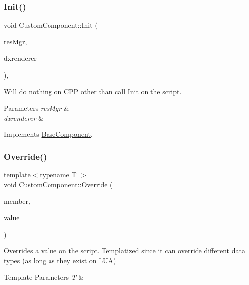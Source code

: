\subsubsection{\texorpdfstring{Init()}{Init()}}
{\footnotesize\ttfamily void Custom\+Component\+::\+Init (\begin{DoxyParamCaption}\item[{\hyperlink{classResourceManager}{Resource\+Manager} $\ast$}]{res\+Mgr,  }\item[{\hyperlink{classDXRenderer}{D\+X\+Renderer} $\ast$}]{dxrenderer }\end{DoxyParamCaption})\hspace{0.3cm}{\ttfamily [override]}, {\ttfamily [virtual]}}



Will do nothing on C\+PP other than call Init on the script. 


\begin{DoxyParams}{Parameters}
{\em res\+Mgr} & \\
\hline
{\em dxrenderer} & \\
\hline
\end{DoxyParams}


Implements \hyperlink{classBaseComponent}{Base\+Component}.

\mbox{\label{classCustomComponent_ab3107db0a720c77d00f9b73060cbcef3}} 
\subsubsection{\texorpdfstring{Override()}{Override()}}
{\footnotesize\ttfamily template$<$typename T $>$ \\
void Custom\+Component\+::\+Override (\begin{DoxyParamCaption}\item[{std\+::string}]{member,  }\item[{T}]{value }\end{DoxyParamCaption})}



Overrides a value on the script. Templatized since it can override different data types (as long as they exist on L\+UA) 


\begin{DoxyTemplParams}{Template Parameters}
{\em T} & \\
\hline
\end{DoxyTemplParams}

